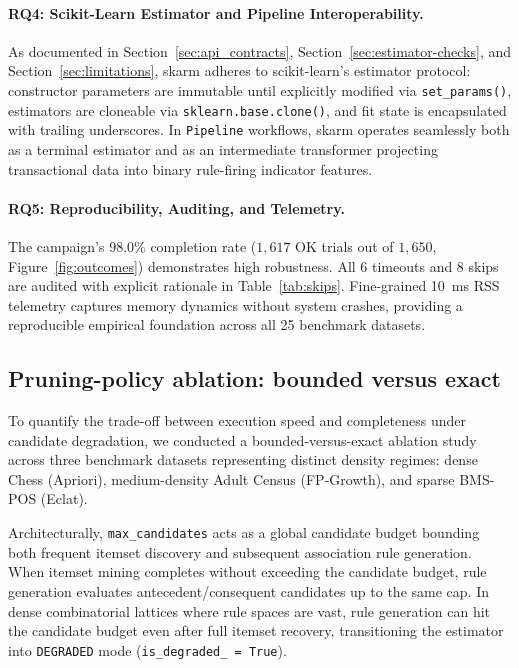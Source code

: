 \documentclass[twocolumn,10pt]{article}
\newcommand{\skarm}{\textsf{skarm}\xspace}
\begin{document}
\paragraph{RQ4: Scikit-Learn Estimator and Pipeline Interoperability.} As documented in Section~\ref{sec:api_contracts}, Section~\ref{sec:estimator-checks}, and Section~\ref{sec:limitations}, \skarm adheres to scikit-learn's estimator protocol: constructor parameters are immutable until explicitly modified via \texttt{set\_params()}, estimators are cloneable via \texttt{sklearn.base.clone()}, and fit state is encapsulated with trailing underscores. In \texttt{Pipeline} workflows, \skarm operates seamlessly both as a terminal estimator and as an intermediate transformer projecting transactional data into binary rule-firing indicator features.

\paragraph{RQ5: Reproducibility, Auditing, and Telemetry.} The campaign's 98.0\% completion rate ($1{,}617$ OK trials out of $1{,}650$, Figure~\ref{fig:outcomes}) demonstrates high robustness. All 6 timeouts and 8 skips are audited with explicit rationale in Table~\ref{tab:skips}. Fine-grained 10~ms RSS telemetry captures memory dynamics without system crashes, providing a reproducible empirical foundation across all 25 benchmark datasets.

\subsection{Pruning-policy ablation: bounded versus exact}
\label{sec:ablation}
To quantify the trade-off between execution speed and completeness under candidate degradation, we conducted a bounded-versus-exact ablation study across three benchmark datasets representing distinct density regimes: dense Chess (Apriori), medium-density Adult Census (FP-Growth), and sparse BMS-POS (Eclat).

Architecturally, \texttt{max\_candidates} acts as a global candidate budget bounding both frequent itemset discovery and subsequent association rule generation. When itemset mining completes without exceeding the candidate budget, rule generation evaluates antecedent/consequent candidates up to the same cap. In dense combinatorial lattices where rule spaces are vast, rule generation can hit the candidate budget even after full itemset recovery, transitioning the estimator into \texttt{DEGRADED} mode (\texttt{is\_degraded\_ = True}).
\end{document}

